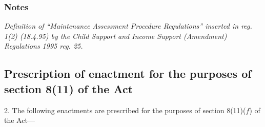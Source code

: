 \documentclass[a4paper]{article}
\newcommand\amendment[1]{\subsubsection*{Notes}{\itshape\frenchspacing\footnotesize #1 \par}}
\begin{document}
\amendment{
Definition of ``Maintenance Assessment Procedure Regulations'' inserted in reg. 1(2) (18.4.95) by the Child Support and Income Support (Amendment) Regulations 1995 reg. 25.
}

\subsection[2. Prescription of enactment for the purposes of section 8(11) of the Act]{Prescription of enactment for the purposes of section 8(11) of the Act}


2.  The following enactments are prescribed for the purposes of section 8(11)($f$) of the Act—
\end{document}
